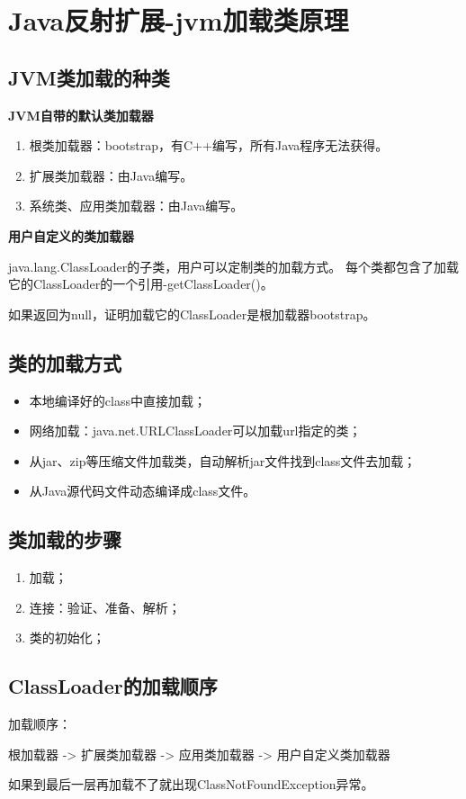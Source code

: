 \section{Java反射扩展-jvm加载类原理}
\subsection{JVM类加载的种类}
\noindent \textbf{JVM自带的默认类加载器}
\begin{enumerate}
	\item 根类加载器：bootstrap，有C++编写，所有Java程序无法获得。
	\item 扩展类加载器：由Java编写。
	\item 系统类、应用类加载器：由Java编写。
\end{enumerate}
\textbf{用户自定义的类加载器}
\par java.lang.ClassLoader的子类，用户可以定制类的加载方式。
每个类都包含了加载它的ClassLoader的一个引用-getClassLoader()。
\par 如果返回为null，证明加载它的ClassLoader是根加载器bootstrap。
\subsection{类的加载方式}
\begin{itemize}
	\item 本地编译好的class中直接加载；
	\item 网络加载：java.net.URLClassLoader可以加载url指定的类；
	\item 从jar、zip等压缩文件加载类，自动解析jar文件找到class文件去加载；
	\item 从Java源代码文件动态编译成class文件。
\end{itemize}
\subsection{类加载的步骤}
\begin{enumerate}
	\item 加载；
	\item 连接：验证、准备、解析；
	\item 类的初始化；
\end{enumerate}
\subsection{ClassLoader的加载顺序}
\noindent 加载顺序：
\par 根加载器 -> 扩展类加载器 -> 应用类加载器 -> 用户自定义类加载器
\par 如果到最后一层再加载不了就出现ClassNotFoundException异常。
